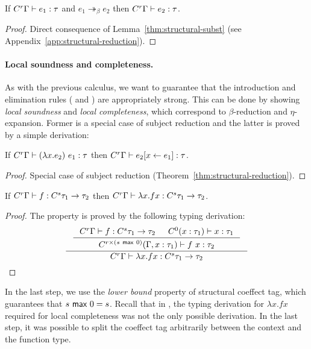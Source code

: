\begin{theorem}
\label{thm:structural-reduction}
If $C^{r}\Gamma \vdash e_1 : \tau$ and $e_1 \twoheadrightarrow_\beta e_2$ then 
$C^{r}\Gamma \vdash e_2 : \tau$.
\end{theorem}
\begin{proof}
Direct consequence of Lemma~\ref{thm:structural-subst} (see Appendix~\ref{app:structural-reduction}).
\end{proof}

\paragraph{Local soundness and completeness.}
As with the previous calculus, we want to guarantee that the introduction and
elimination rules ( and ) are appropriately strong. 
This can be done by showing \emph{local soundness} and \emph{local completeness},
which correspond to $\beta$-reduction and $\eta$-expansion. Former is a special
case of subject reduction and the latter is proved by a simple derivation:
%
\begin{theorem}
If $C^{r}\Gamma \vdash (\lambda x.e_2)~e_1 : \tau$ then
$C^{r}\Gamma \vdash e_2[x \leftarrow e_1] : \tau$.
\end{theorem}
\begin{proof}
Special case of subject reduction (Theorem~\ref{thm:structural-reduction}).
\end{proof}
%
\begin{theorem}
If $C^{r}\Gamma \vdash f : C^{s}\tau_1 \rightarrow \tau_2$ then
$C^{r}\Gamma \vdash \lambda x.f x : C^{s}\tau_1 \rightarrow \tau_2$.
\end{theorem}
\begin{proof} The property is proved by the following typing derivation:
%
\begin{equation*}
\inference
  {\inference
     {\ctyp{r}{\Gamma} \vdash f : \ctyp{s}{\tau_1} \rightarrow \tau_2 &
      \ctyp{0}{(x:\tau_1)} \vdash x : \tau_1 }
     {\ctyp{r \cprd (s \cvop 0)}{(\Gamma, x:\tau_1)} \vdash f~x : \tau_2}}
  {\ctyp{r}{\Gamma} \vdash \lambda x.f x : \ctyp{s}{\tau_1} \rightarrow \tau_2 }
\qedhere
\end{equation*}
\end{proof}
%
In the last step, we use the \emph{lower bound} property of structural coeffect tag, which
guarantees that $s~\textnormal{\sffamily max}~0 = s$. Recall that in \clflt, the typing derivation for
$\lambda x.f x$ required for local completeness was not the only possible derivation.
In the last step, it was possible to split the coeffect tag arbitrarily between the 
context and the function type. 

